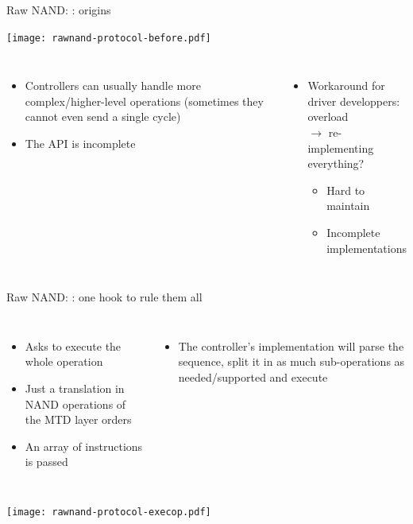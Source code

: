 \documentclass[aspectratio=169,obeyspaces,spaces,hyphens,dvipsnames]{beamer}
\begin{document}
\begin{frame}{Raw NAND: {\bf{}}: origins}
  \begin{center}
    \texttt{[image: rawnand-protocol-before.pdf]}
  \end{center}
  \vfill
  \begin{columns}
    \begin{itemize}
    \item Controllers can usually handle more complex/higher-level
      operations (sometimes they cannot even send a single cycle)
    \item The API is incomplete
    \end{itemize}
    \begin{itemize}
    \item Workaround for driver developpers: overload
      \\ $\rightarrow$ re-implementing everything?
      \begin{itemize}
      \item Hard to maintain
      \item Incomplete implementations
      \end{itemize}
    \end{itemize}
  \end{columns}
\end{frame}

\begin{frame}{Raw NAND: {\bf{}}: one hook to rule
      them all}
  \begin{columns}
    \begin{itemize}
    \item Asks to execute the whole operation
    \item Just a translation in NAND operations of the MTD layer orders
    \item An array of instructions is passed
    \end{itemize}
    \begin{itemize}
    \item The controller's implementation will parse the sequence, split
      it in as much sub-operations as needed/supported and execute
    \end{itemize}
  \end{columns}
  \vfill
  \begin{center}
    \texttt{[image: rawnand-protocol-execop.pdf]}
  \end{center}
\end{frame}
\end{document}
